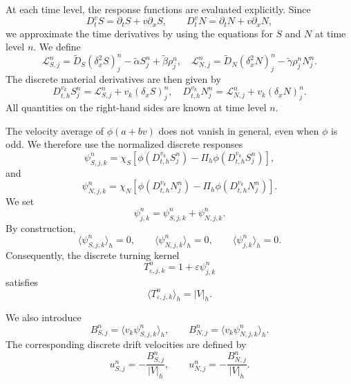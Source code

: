 \documentclass[11pt,twoside]{article}
\numberwithin{equation}{section}
\theoremstyle{plain}
\theoremstyle{nonumberplain}
\begin{document}
{At each time level, the response functions are evaluated explicitly. Since
\[
D_t^v S=\partial_t S+v\partial_x S,
\qquad
D_t^v N=\partial_t N+v\partial_x N,
\]
we approximate the time derivatives by using the equations for \(S\) and
\(N\) at time level \(n\). We define
\[
\mathcal L_{S,j}^n
=
\widetilde D_S(\delta_x^2 S)_j^n
-\widetilde\alpha S_j^n
+\widetilde\beta \rho_j^n,
\quad 
\mathcal L_{N,j}^n
=
\widetilde D_N(\delta_x^2 N)_j^n
-\widetilde\gamma \rho_j^n N_j^n .
\]
The discrete material derivatives are then given by
\[
D_{t,h}^{v_k}S_j^n
=
\mathcal L_{S,j}^n
+
v_k(\delta_x S)_j^n,
\quad 
D_{t,h}^{v_k}N_j^n
=
\mathcal L_{N,j}^n
+
v_k(\delta_x N)_j^n .
\]
All quantities on the right-hand sides are known at time level \(n\).

The velocity average of \(\phi(a+bv)\) does not vanish in general, even
when \(\phi\) is odd. We therefore use the normalized discrete responses
\[
\psi_{S,j,k}^n
=
\chi_S
\left[
\phi\left(D_{t,h}^{v_k}S_j^n\right)
-
\Pi_h
\phi\left(D_{t,h}^{v_k}S_j^n\right)
\right],
\]
and
\[
\psi_{N,j,k}^n
=
\chi_N
\left[
\phi\left(D_{t,h}^{v_k}N_j^n\right)
-
\Pi_h
\phi\left(D_{t,h}^{v_k}N_j^n\right)
\right].
\]
We set
\[
\psi_{j,k}^n
=
\psi_{S,j,k}^n+\psi_{N,j,k}^n .
\]
By construction,
\[
\langle \psi_{S,j,k}^n\rangle_h=0,
\qquad
\langle \psi_{N,j,k}^n\rangle_h=0,
\qquad
\langle \psi_{j,k}^n\rangle_h=0.
\]
Consequently, the discrete turning kernel
\[
T_{\varepsilon,j,k}^n
=
1+\varepsilon \psi_{j,k}^n
\]
satisfies
\[
\langle T_{\varepsilon,j,k}^n\rangle_h=|V|_h.
\]

We also introduce
\[
B_{S,j}^n
=
\langle v_k\psi_{S,j,k}^n\rangle_h,
\qquad
B_{N,j}^n
=
\langle v_k\psi_{N,j,k}^n\rangle_h.
\]
The corresponding discrete drift velocities are defined by
\[
u_{S,j}^n
=
-\frac{B_{S,j}^n}{|V|_h},
\qquad
u_{N,j}^n
=
-\frac{B_{N,j}^n}{|V|_h}.
\]

}
\end{document}
